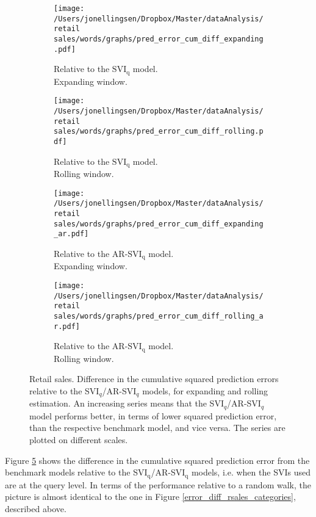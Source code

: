 \begin{figure}[H]
    \centering
    \begin{subfigure}[b]{0.45\textwidth}
\caption{Relative to the $\text{SVI}_\text{q}$ model.\\Expanding window.}
\label{error_diff_rsales_queries_plain_expanding}
        \texttt{[image: /Users/jonellingsen/Dropbox/Master/dataAnalysis/retail sales/words/graphs/pred\_error\_cum\_diff\_expanding.pdf]}
    \end{subfigure}\hfill
    \begin{subfigure}[b]{0.45\textwidth}
\caption{Relative to the $\text{SVI}_\text{q}$ model.\\Rolling window.}
\label{error_diff_rsales_queries_plain_rolling}
        \texttt{[image: /Users/jonellingsen/Dropbox/Master/dataAnalysis/retail sales/words/graphs/pred\_error\_cum\_diff\_rolling.pdf]}
    \end{subfigure}
\begin{subfigure}[b]{0.45\textwidth}
 \caption{Relative to the AR-$\text{SVI}_\text{q}$ model.\\Expanding window.}
\label{error_diff_rsales_queries_ar_expanding}       
\texttt{[image: /Users/jonellingsen/Dropbox/Master/dataAnalysis/retail sales/words/graphs/pred\_error\_cum\_diff\_expanding\_ar.pdf]}
    \end{subfigure}\hfill
\begin{subfigure}[b]{0.45\textwidth}
\caption{Relative to the AR-$\text{SVI}_\text{q}$ model.\\Rolling window.} 
\label{error_diff_rsales_queries_ar_rolling}       
\texttt{[image: /Users/jonellingsen/Dropbox/Master/dataAnalysis/retail sales/words/graphs/pred\_error\_cum\_diff\_rolling\_ar.pdf]}
    \end{subfigure}
\caption{Retail sales. Difference in the cumulative squared prediction errors relative to the SVI$_q$/AR-SVI$_q$ models, for expanding and rolling estimation. An increasing series means that the SVI$_q$/AR-SVI$_q$ model performs better, in terms of lower squared prediction error, than the respective benchmark model, and vice versa. The series are plotted on different scales.}
\label{error_diff_rsales_queries}
\end{figure}

Figure \ref{error_diff_rsales_queries} shows the difference in the cumulative squared prediction error from the benchmark models relative to the SVI$_\text{q}$/AR-SVI$_\text{q}$ models, i.e. when the SVIs used are at the query level. In terms of the performance relative to a random walk, the picture is almost identical to the one in Figure \ref{error_diff_rsales_categories}, described above.

